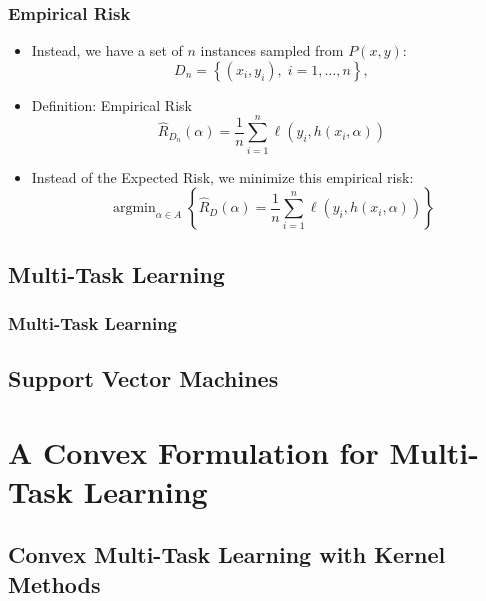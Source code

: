 \documentclass{beamer}
\DeclareMathOperator*{\argmin}{arg\min}
\newcommand{\set}[1]{\left\{#1\right\}}
\newcommand{\hypf}{h}
\newcommand{\hyp}[2]{\hypf\left(#1, #2\right)}
\newcommand{\nsamples}{n}
\newcommand{\param}{\alpha}
\newcommand{\paramspace}{A}
\newcommand{\distf}{P}
\newcommand{\sample}{D}
\newcommand{\samplen}{D_{\nsamples}}
\newcommand{\risk}{R}
\newcommand{\emprisk}{\hat{\risk}_{\sample}}
\newcommand{\empriskn}{\hat{\risk}_{\samplen}}
\begin{document}
\begin{frame}
      \frametitle{Empirical Risk}

      \begin{itemize}
            \item Instead, we have a set of $\nsamples$ instances sampled from $\distf(x,y)$:
            \begin{equation}
                  \nonumber
                  \samplen = \set{(x_i, y_i), \; i=1, \ldots, \nsamples} ,
              \end{equation}
            \item Definition: Empirical Risk
            $$ \empriskn(\param) = \frac{1}{\nsamples} \sum_{i=1}^\nsamples \ell(y_i, \hyp{x_i}{\param}) $$
            \item Instead of the Expected Risk, we minimize this empirical risk:
            \begin{equation}
                  \nonumber
                  \argmin_{\param \in \paramspace} \left\{ \emprisk(\param) = \frac{1}{\nsamples} \sum_{i=1}^\nsamples \ell(y_i, \hyp{x_i}{\param}) \right\}
              \end{equation}
      \end{itemize}

\end{frame}



\subsection{Multi-Task Learning}

\begin{frame}
      \frametitle{Multi-Task Learning}

      

\end{frame}

\subsection{Support Vector Machines}

\section{A Convex Formulation for Multi-Task Learning}
\subsection{Convex Multi-Task Learning with Kernel Methods}
\end{document}
